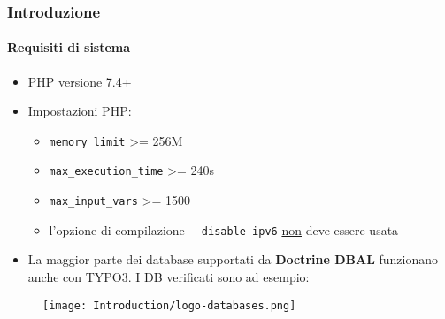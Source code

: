 %

\begin{frame}[fragile]
	\frametitle{Introduzione}
	\framesubtitle{Requisiti di sistema}

	\begin{itemize}
		\item PHP versione 7.4+
		\item Impostazioni PHP:

			\begin{itemize}
				\item \texttt{memory\_limit} >= 256M
				\item \texttt{max\_execution\_time} >= 240s
				\item \texttt{max\_input\_vars} >= 1500
				\item l'opzione di compilazione \texttt{-}\texttt{-disable-ipv6} \underline{non} deve essere usata
			\end{itemize}

		\item La maggior parte dei database supportati da \textbf{Doctrine DBAL} funzionano anche con TYPO3.
			I DB verificati sono ad esempio:
	\end{itemize}

	\begin{figure}
		\texttt{[image: Introduction/logo-databases.png]}
	\end{figure}

\end{frame}

